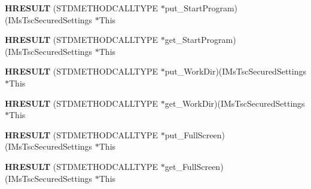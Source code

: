 \begin{DoxyCompactItemize}
\mbox{\label{struct_i_ms_tsc_secured_settings_vtbl_af2893437ee2f589a8e88a3fb8e4a71e9}} 
{\bfseries H\+R\+E\+S\+U\+LT} (S\+T\+D\+M\+E\+T\+H\+O\+D\+C\+A\+L\+L\+T\+Y\+PE $\ast$put\+\_\+\+Start\+Program)(I\+Ms\+Tsc\+Secured\+Settings $\ast$This
\item 
\mbox{\label{struct_i_ms_tsc_secured_settings_vtbl_aec6cdd76de6759fe12fa7659354c7ba4}} 
{\bfseries H\+R\+E\+S\+U\+LT} (S\+T\+D\+M\+E\+T\+H\+O\+D\+C\+A\+L\+L\+T\+Y\+PE $\ast$get\+\_\+\+Start\+Program)(I\+Ms\+Tsc\+Secured\+Settings $\ast$This
\item 
\mbox{\label{struct_i_ms_tsc_secured_settings_vtbl_ae57d039c4e527f091fc575977444135a}} 
{\bfseries H\+R\+E\+S\+U\+LT} (S\+T\+D\+M\+E\+T\+H\+O\+D\+C\+A\+L\+L\+T\+Y\+PE $\ast$put\+\_\+\+Work\+Dir)(I\+Ms\+Tsc\+Secured\+Settings $\ast$This
\item 
\mbox{\label{struct_i_ms_tsc_secured_settings_vtbl_a23fd36dc256bf214754d79ad46003bcf}} 
{\bfseries H\+R\+E\+S\+U\+LT} (S\+T\+D\+M\+E\+T\+H\+O\+D\+C\+A\+L\+L\+T\+Y\+PE $\ast$get\+\_\+\+Work\+Dir)(I\+Ms\+Tsc\+Secured\+Settings $\ast$This
\item 
\mbox{\label{struct_i_ms_tsc_secured_settings_vtbl_aa75127506fee16cf930f1c173a916f3d}} 
{\bfseries H\+R\+E\+S\+U\+LT} (S\+T\+D\+M\+E\+T\+H\+O\+D\+C\+A\+L\+L\+T\+Y\+PE $\ast$put\+\_\+\+Full\+Screen)(I\+Ms\+Tsc\+Secured\+Settings $\ast$This
\item 
\mbox{\label{struct_i_ms_tsc_secured_settings_vtbl_aeac146f05396d19833fad49d324554ea}} 
{\bfseries H\+R\+E\+S\+U\+LT} (S\+T\+D\+M\+E\+T\+H\+O\+D\+C\+A\+L\+L\+T\+Y\+PE $\ast$get\+\_\+\+Full\+Screen)(I\+Ms\+Tsc\+Secured\+Settings $\ast$This
\end{DoxyCompactItemize}

